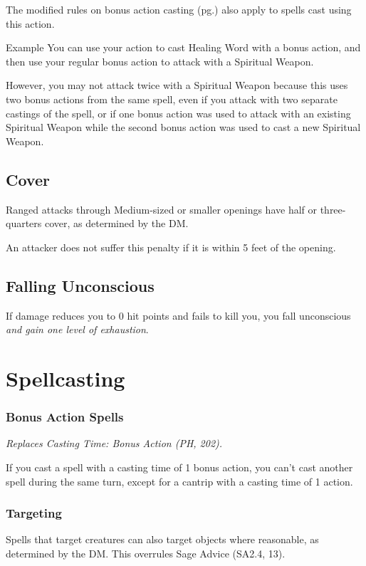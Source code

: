 \documentclass[House_Rules.tex]{subfiles}
\begin{document}
The modified rules on bonus action casting (pg.\pageref{bonusActionSpells}) also apply to spells cast using this action.

\begin{DndComment}{Example}
You can use your action to cast Healing Word with a bonus action, and then use your regular bonus action to attack with a Spiritual Weapon. 

However, you may not attack twice with a Spiritual Weapon because this uses two bonus actions from the same spell, even if you attack with two separate castings of the spell, or if one bonus action was used to attack with an existing Spiritual Weapon while the second bonus action was used to cast a new Spiritual Weapon.
\end{DndComment}

\subsection{Cover}
Ranged attacks through Medium-sized or smaller openings have half or three-quarters cover, as determined by the DM. 

An attacker does not suffer this penalty if it is within 5 feet of the opening.

\subsection{Falling Unconscious}
If damage reduces you to 0 hit points and fails to kill you, you fall unconscious \textit{and gain one level of exhaustion}.


\section{Spellcasting}

\subsubsection{Bonus Action Spells}
\label{bonusActionSpells}
\textit{Replaces Casting Time: Bonus Action (PH, 202).}

If you cast a spell with a casting time of 1 bonus action, you can't cast another spell during the same turn, except for a cantrip with a casting time of 1 action.

\subsubsection{Targeting}
Spells that target creatures can also target objects where reasonable, as determined by the DM. This overrules Sage Advice (SA2.4, 13).
\end{document}
